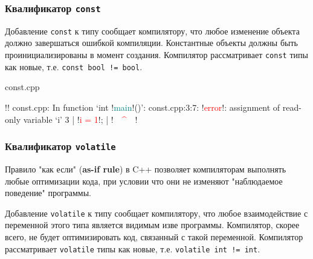 \documentclass[compress, 8pt]{beamer}
\begin{document}
\begin{frame}[fragile]

    \frametitle{Квалификатор \texttt{const}}

    Добавление \verb|const| к типу сообщает компилятору, что
    любое изменение объекта должно завершаться ошибкой компиляции.
    Константные объекты должны быть проинициализированы в момент
    создания.
    Компилятор рассматривает \verb|const| типы как новые,
    т.е. \verb|const bool != bool|.

        {const.cpp}

    \begin{terminalwindow}
!!
const.cpp: In function ‘int !\textcolor{teal}{main}!()’:
const.cpp:3:7: !\textcolor{red}{error}!: assignment of read-only variable ‘i’
    3 |     !\textcolor{red}{i = 1}!;
      |      !\textcolor{red}{~~\^{}~~}!
    \end{terminalwindow}

\end{frame}

\begin{frame}[fragile]

    \frametitle{Квалификатор \texttt{volatile}}

    Правило "как если" (\textbf{as-if rule}) в C++ позволяет компиляторам
    выполнять любые оптимизации кода, при условии что они не изменяют
    "наблюдаемое поведение" программы.

    \hfill \break

    Добавление \verb|volatile| к типу сообщает компилятору, что
    любое взаимодействие с переменной этого типа является
    видимым изве программы. Компилятор, скорее всего, не
    будет оптимизировать код, связанный с такой переменной.
    Компилятор рассматривает \verb|volatile| типы как новые,
    т.е. \verb|volatile int != int|.

\end{frame}
\end{document}
